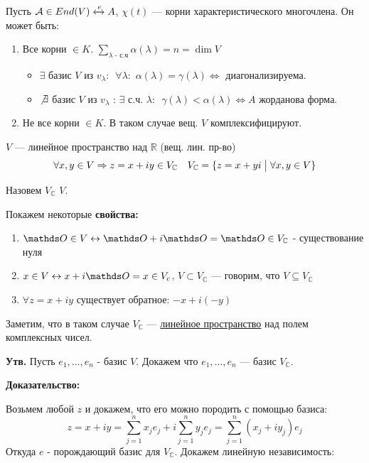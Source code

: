 Пусть $\mathcal{A} \in End(V) \xleftrightarrow{e} A $, $\chi(t)$ --- корни характеристического многочлена. Он может быть:

\begin{enumerate}
    \item Все корни $\in K$. $\sum\limits_{\lambda \text{ - с.ч}}\alpha(\lambda) = n  = \dim V$
    \begin{itemize}
        \item $\exists$ базис $V$ из $v_{\lambda} $: $\,\,\forall \lambda:\,\,\alpha(\lambda)=\gamma(\lambda) \iff$ диагонализируема.
        \item $\not \exists $ базис $V$ из $v_{\lambda} \,\,$: $\exists $ с.ч. $\lambda$: $\,\, \gamma(\lambda) < \alpha(\lambda) \iff A$ жорданова форма.
    \end{itemize}
    \item Не все корни $\in K$. В таком случае вещ. $V$ комплексифицируют.
\end{enumerate}


 $V$ --- линейное пространство над $\mathbb{R}$ (вещ. лин. пр-во)
$$\forall x,y \in V \Rightarrow  z = x+iy \in V_{\mathbb{C}} \quad V_{\mathbb{C}} = \{ z = x+yi \bigm| \forall x,y \in V\}$$

Назовем $V_{\mathbb{C}}$  $V$.

Покажем некоторые \textbf{свойства:}
\begin{enumerate}
    \item $\zero \in V \leftrightarrow \zero + i\zero = \zero \in V_{\mathbb{C}}$ - существование нуля 
     \item $x \in V \leftrightarrow x +i\zero = x \in V_c$, $V \subset V_{\mathbb{C}}$ --- говорим, что $V\subseteq  V_{\mathbb{C}}$ 
    \item $\forall z = x + iy$ существует обратное: $-x+i(-y)$
\end{enumerate}

Заметим, что в таком случае $V_\mathbb{C}$ ---  \uline{линейное пространство} над полем комплексных чисел.


\textbf{Утв.} Пусть $e_1,\ldots,e_n$ - базис $V$. Докажем что $e_1,\ldots, e_n$ --- базис $V_{\mathbb{C}}$.

\textbf{Доказательство:}

Возьмем любой $z$ и докажем, что его можно породить с помощью базиса:
$$z = x + iy = \sum\limits_{j=1}^n x_j e_j + i\sum\limits_{j=1}^ny_j e_j = \sum\limits_{j=1}^n(x_j+iy_j)e_j$$
Откуда $e$ - порождающий базис для $V_{\mathbb{C}}$. Докажем линейную независимость:

